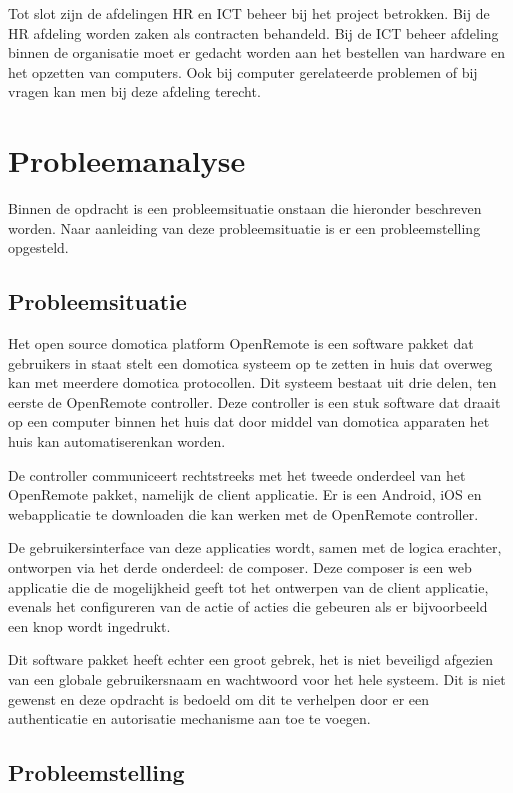 \documentclass[]{article}
\begin{document}
Tot slot zijn de afdelingen HR en ICT beheer bij het project betrokken. Bij
de HR afdeling worden zaken als contracten behandeld. Bij de ICT beheer
afdeling binnen de organisatie moet er gedacht worden aan het bestellen van
hardware en het opzetten van computers. Ook bij computer gerelateerde problemen of
bij vragen kan men bij deze afdeling terecht.

\newpage
\section{Probleemanalyse}
Binnen de opdracht is een probleemsituatie onstaan die hieronder
beschreven worden. Naar aanleiding van deze probleemsituatie is er een
probleemstelling opgesteld.

\subsection{Probleemsituatie}

Het open source domotica platform OpenRemote is een software pakket dat
gebruikers in staat stelt een domotica systeem op te zetten in huis dat
overweg kan met meerdere domotica protocollen. Dit systeem bestaat uit drie
delen, ten eerste de OpenRemote controller. Deze controller is een stuk
software dat draait op een computer binnen het huis dat door middel van
domotica apparaten het huis kan automatiserenkan worden.

De controller communiceert rechtstreeks met het tweede onderdeel van het
OpenRemote pakket, namelijk de client applicatie. Er is een Android, iOS en
webapplicatie te downloaden die kan werken met de OpenRemote controller.

De gebruikersinterface van deze applicaties wordt, samen met de logica
erachter, ontworpen via het derde onderdeel: de composer. Deze composer is
een web applicatie die de mogelijkheid geeft tot het ontwerpen van de
client applicatie, evenals het configureren van de actie of acties die
gebeuren als er bijvoorbeeld een knop wordt ingedrukt.

Dit software pakket heeft echter een groot gebrek, het is niet beveiligd
afgezien van een globale gebruikersnaam en wachtwoord voor het hele
systeem. Dit is niet gewenst en deze opdracht is bedoeld om dit te verhelpen door
er een authenticatie en autorisatie mechanisme aan toe te voegen.

\subsection{Probleemstelling}
\end{document}
